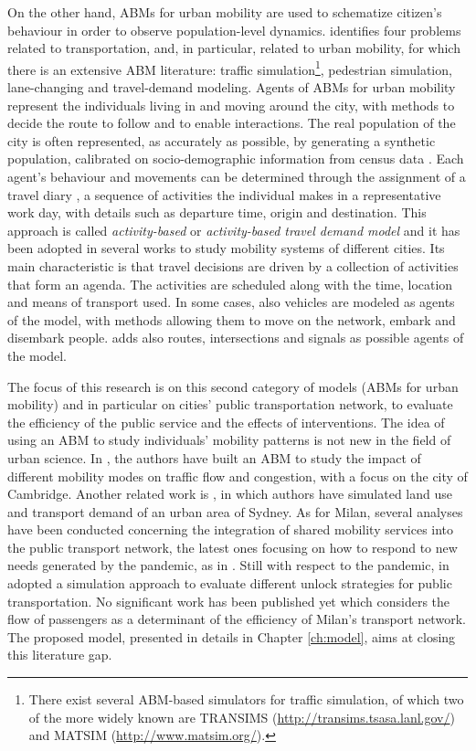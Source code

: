 On the other hand, ABMs for urban mobility are used to schematize citizen's behaviour in order to observe population-level dynamics.
\textcite{bernhardt2007agent} identifies four problems related to transportation, and, in particular, related to urban mobility, for which there is an extensive ABM literature: traffic simulation\footnote{There exist several ABM-based simulators for traffic simulation, of which two of the more widely known are TRANSIMS (\url{http://transims.tsasa.lanl.gov/}) and MATSIM (\url{http://www.matsim.org/}).}, pedestrian simulation, lane-changing and travel-demand modeling.  
Agents of ABMs for urban mobility represent the individuals living in and moving around the city, with methods to decide the route to follow and to enable interactions. The real population of the city is often represented, as accurately as possible, by generating a synthetic population, calibrated on socio-demographic information from census data \cite{bib6}. Each agent’s behaviour and movements can be determined through the assignment of a travel diary \cite{bib7}, a sequence of activities the individual makes in a representative work day, with details such as departure time, origin and destination. This approach is called \textit{activity-based} \cite{bib8} or \textit{activity-based travel demand model} \cite{bib3} and it has been adopted in several works to study mobility systems of different cities. Its main characteristic is that travel decisions are driven by a collection of activities that form an agenda. The activities are scheduled along with the time, location and means of transport used.
In some cases, also vehicles are modeled as agents of the model, with methods allowing them to move on the network, embark and disembark people. \textcite{Bazghandi_techniques} adds also routes, intersections and signals as possible agents of the model. 

The focus of this research is on this second category of models (ABMs for urban mobility) and in particular on cities' public transportation network, to evaluate the efficiency of the public service and the effects of interventions. The idea of using an ABM to study individuals’ mobility patterns is not new in the field of urban science. In \textcite{bib9}, the authors have built an ABM to study the impact of different mobility modes on traffic flow and congestion, with a focus on the city of Cambridge. Another related work is \textcite{bib7}, in which authors have simulated land use and transport demand of an urban area of Sydney. As for Milan, several analyses have been conducted concerning the integration of shared mobility services into the public transport network, the latest ones focusing on how to respond to new needs generated by the pandemic, as in \textcite{bib10}. Still with respect to the pandemic, in \textcite{bib11} adopted a simulation approach to evaluate different unlock strategies for public transportation. No significant work has been published yet which considers the flow of passengers as a determinant of the efficiency of Milan’s transport network. The proposed model, presented in details in Chapter \ref{ch:model}, aims at closing this literature gap. 


